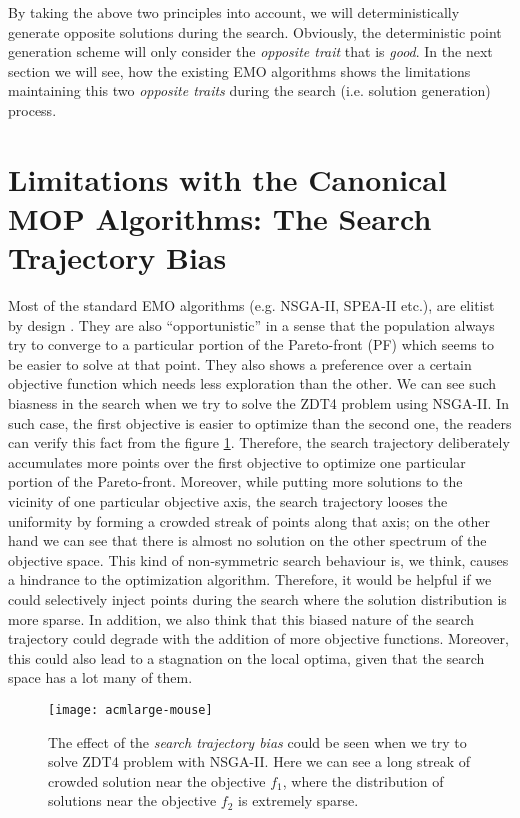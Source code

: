 \documentclass[journal]{IEEEtran}
\begin{document}
By taking the above two principles into account, we will deterministically generate opposite solutions during the search. Obviously, the deterministic point generation scheme will only consider the \textit{opposite trait} that is \textit{good}. In the next section we will see, how the existing EMO algorithms shows the limitations maintaining this two \textit{opposite traits} during the search (i.e. solution generation) process.  

\section{Limitations with the Canonical MOP Algorithms: The Search Trajectory Bias}
\label{sec:limitation-canonical}
Most of the standard EMO algorithms (e.g. NSGA-II, SPEA-II etc.), are elitist by design \cite{?}\cite{?}. They are also ``opportunistic'' in a sense that the population always try to converge to a particular portion of the Pareto-front (PF) which seems to be easier to solve at that point. They also shows a preference over a certain objective function which needs less exploration than the other. We can see such biasness in the search when we try to solve the ZDT4 problem using NSGA-II. In such case, the first objective is easier to optimize than the second one, the readers can verify this fact from the figure \ref{fig:zdt4-unbalanced-snapshot}. Therefore, the search trajectory deliberately accumulates more points over the first objective to optimize one particular portion of the Pareto-front. Moreover, while putting more solutions to the vicinity of one particular objective axis, the search trajectory looses the uniformity by forming a crowded streak of points along that axis; on the other hand we can see that there is almost no solution on the other spectrum of the objective space. This kind of non-symmetric search behaviour is, we think, causes a hindrance to the optimization algorithm. Therefore, it would be helpful if we could selectively inject points during the search where the solution distribution is more sparse. In addition, we also think that this biased nature of the search trajectory could degrade with the addition of more objective functions. Moreover, this could also lead to a stagnation on the local optima, given that the search space has a lot many of them.
%
\begin{figure}[tp]
\centering
\texttt{[image: acmlarge-mouse]}
\caption{The effect of the \textit{search trajectory bias} could be seen when we try to solve ZDT4 problem with NSGA-II. Here we can see a long streak of crowded solution near the objective \(f_1\), where the distribution of solutions near the objective \(f_2\) is extremely sparse.}
\label{fig:zdt4-unbalanced-snapshot}
\end{figure}
\end{document}
